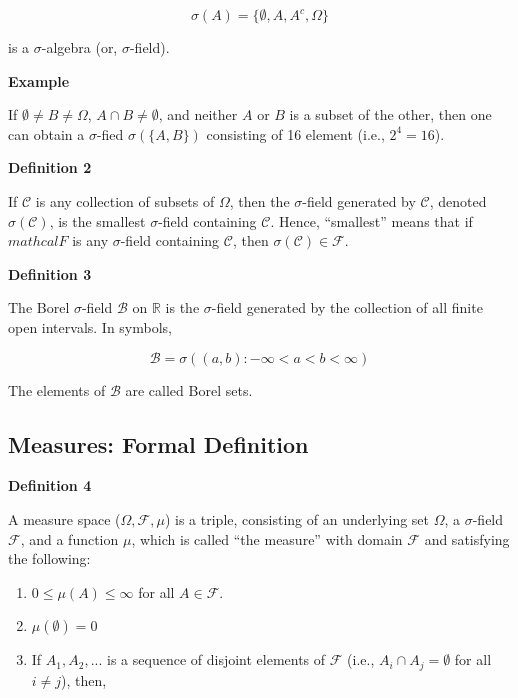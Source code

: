 \documentclass[]{book}
\begin{document}
\[\sigma(A)=\{\emptyset, A, A^c, \Omega\}\]

is a \(\sigma\)-algebra (or, \(\sigma\)-field).

\textbf{Example}

If \(\emptyset \neq B \neq \Omega\), \(A\cap B \neq \emptyset\), and
neither \(A\) or \(B\) is a subset of the other, then one can obtain a
\(\sigma\)-fied \(\sigma(\{A, B\})\) consisting of 16 element (i.e.,
\(2^4=16\)).

\textbf{Definition 2}

If \(\mathcal{C}\) is any collection of subsets of \(\Omega\), then the
\(\sigma\)-field generated by \(\mathcal{C}\), denoted
\(\sigma(\mathcal{C})\), is the smallest \(\sigma\)-field containing
\(\mathcal{C}\). Hence, ``smallest'' means that if \(mathcal{F}\) is any
\(\sigma\)-field containing \(\mathcal{C}\), then
\(\sigma(\mathcal{C}) \in \mathcal{F}\).

\textbf{Definition 3}

The Borel \(\sigma\)-field \(\mathcal{B}\) on \(\mathbb{R}\) is the
\(\sigma\)-field generated by the collection of all finite open
intervals. In symbols,

\[\mathcal{B}=\sigma({(a,b): -\infty < a <b< \infty})\]

The elements of \(\mathcal{B}\) are called Borel sets.

\subsection{Measures: Formal
Definition}\label{measures-formal-definition}

\textbf{Definition 4}

A measure space (\(\Omega, \mathcal{F}, \mu\)) is a triple, consisting
of an underlying set \(\Omega\), a \(\sigma\)-field \(\mathcal{F}\), and
a function \(\mu\), which is called ``the measure'' with domain
\(\mathcal{F}\) and satisfying the following:

\begin{enumerate}
\def\labelenumi{(\roman{enumi})}
\item
  \(0 \leq \mu(A) \leq \infty\) for all \(A \in \mathcal{F}\).
\item
  \(\mu(\emptyset)=0\)
\item
  If \(A_1, A_2,...\) is a sequence of disjoint elements of
  \(\mathcal{F}\) (i.e., \(A_i \cap A_j = \emptyset\) for all
  \(i \neq j\)), then,
\end{enumerate}
\end{document}
